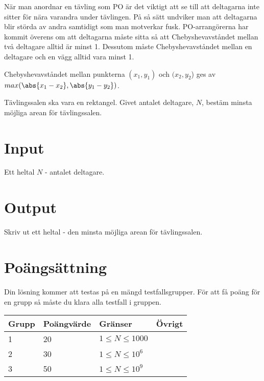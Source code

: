 När man anordnar en tävling som PO är det viktigt att se till att deltagarna inte sitter för nära varandra under tävlingen. På så sätt undviker man att deltagarna blir störda av andra samtidigt som man motverkar fusk. PO-arrangörerna har kommit överens om att deltagarna måste sitta så att Chebyshevavståndet mellan två deltagare alltid är minst 1. Dessutom måste Chebyshevavståndet mellan en deltagare och en vägg alltid vara minst 1. 

Chebyshevavståndet mellan punkterna $(x_1, y_1)$ och $(x_2, y_2$) ges av
$max( \abs{x_1 - x_2}, \abs{y_1 - y_2} )$.

Tävlingssalen ska vara en rektangel. Givet antalet deltagare, $N$, bestäm minsta möjliga arean för tävlingssalen.

\section*{Input}
Ett heltal $N$ - antalet deltagare.

\section*{Output}
Skriv ut ett heltal - den minsta möjliga arean för tävlingssalen.

\section*{Poängsättning}
Din lösning kommer att testas på en mängd testfallsgrupper. För att få poäng för en grupp så måste du klara alla testfall i gruppen.

\begin{tabular}{| l | l | l | l |}
\hline
Grupp & Poängvärde & Gränser & Övrigt\\ \hline
1     & 20         & $ 1 \le N \le 1000 $ & \\ \hline
2     & 30         & $ 1 \le N \le 10^6 $ & \\ \hline
3     & 50         & $ 1 \le N \le 10^9 $ & \\ \hline
\end{tabular}
